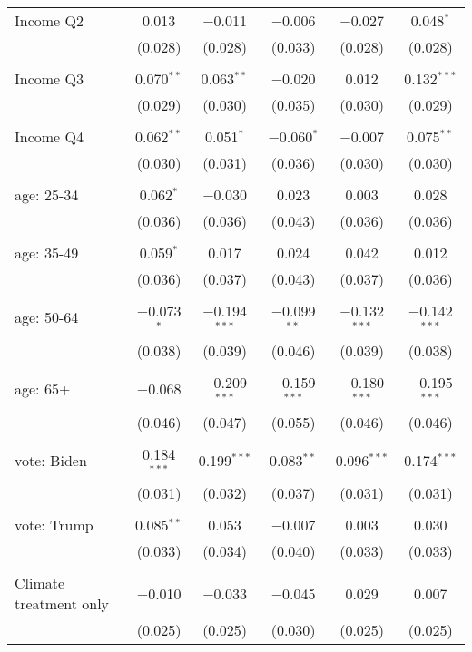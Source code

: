 \begin{tabular}{@{\extracolsep{5pt}}lccccc}
 Income Q2 & 0.013 & $-$0.011 & $-$0.006 & $-$0.027 & 0.048$^{*}$ \\ 
  & (0.028) & (0.028) & (0.033) & (0.028) & (0.028) \\ 
  & & & & & \\ 
 Income Q3 & 0.070$^{**}$ & 0.063$^{**}$ & $-$0.020 & 0.012 & 0.132$^{***}$ \\ 
  & (0.029) & (0.030) & (0.035) & (0.030) & (0.029) \\ 
  & & & & & \\ 
 Income Q4 & 0.062$^{**}$ & 0.051$^{*}$ & $-$0.060$^{*}$ & $-$0.007 & 0.075$^{**}$ \\ 
  & (0.030) & (0.031) & (0.036) & (0.030) & (0.030) \\ 
  & & & & & \\ 
 age: 25-34 & 0.062$^{*}$ & $-$0.030 & 0.023 & 0.003 & 0.028 \\ 
  & (0.036) & (0.036) & (0.043) & (0.036) & (0.036) \\ 
  & & & & & \\ 
 age: 35-49 & 0.059$^{*}$ & 0.017 & 0.024 & 0.042 & 0.012 \\ 
  & (0.036) & (0.037) & (0.043) & (0.037) & (0.036) \\ 
  & & & & & \\ 
 age: 50-64 & $-$0.073$^{*}$ & $-$0.194$^{***}$ & $-$0.099$^{**}$ & $-$0.132$^{***}$ & $-$0.142$^{***}$ \\ 
  & (0.038) & (0.039) & (0.046) & (0.039) & (0.038) \\ 
  & & & & & \\ 
 age: 65+ & $-$0.068 & $-$0.209$^{***}$ & $-$0.159$^{***}$ & $-$0.180$^{***}$ & $-$0.195$^{***}$ \\ 
  & (0.046) & (0.047) & (0.055) & (0.046) & (0.046) \\ 
  & & & & & \\ 
 vote: Biden & 0.184$^{***}$ & 0.199$^{***}$ & 0.083$^{**}$ & 0.096$^{***}$ & 0.174$^{***}$ \\ 
  & (0.031) & (0.032) & (0.037) & (0.031) & (0.031) \\ 
  & & & & & \\ 
 vote: Trump & 0.085$^{**}$ & 0.053 & $-$0.007 & 0.003 & 0.030 \\ 
  & (0.033) & (0.034) & (0.040) & (0.033) & (0.033) \\ 
  & & & & & \\ 
 Climate treatment only & $-$0.010 & $-$0.033 & $-$0.045 & 0.029 & 0.007 \\ 
  & (0.025) & (0.025) & (0.030) & (0.025) & (0.025) \\ 

\end{tabular}
